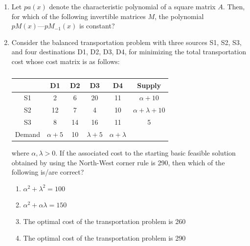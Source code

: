 \documentclass[journal,12pt,onecolumn]{IEEEtran}
\theoremstyle{remark}
\begin{document}
\begin{enumerate}
\item Let $pa(x)$ denote the characteristic polynomial of a square matrix $A$. Then, for which of the following invertible matrices $M$, the polynomial $pM(x) — pM_{-1}(x)$ is constant?  

\begin{enumerate}
\end{enumerate}  
\hfill{}

\item Consider the balanced transportation problem with three sources S1, S2, S3, and four destinations D1, D2, D3, D4, for minimizing the total transportation cost whose cost matrix is as follows:  

\begin{table}[h!]
\centering
\begin{tabular}{|c|c|c|c|c|c|}
\hline
        & D1 & D2 & D3 & D4 & Supply \\ \hline
S1      & 2  & 6  & 20 & 11 & $\alpha+10$ \\ \hline
S2      & 12 & 7  & 4  & 10 & $\alpha+\lambda+10$ \\ \hline
S3      & 8  & 14 & 16 & 11 & 5 \\ \hline
Demand  & $\alpha+5$ & 10 & $\lambda+5$ & $\alpha+\lambda$ & \\ \hline
\end{tabular}
\caption*{}
\label{tab:q24}
\end{table}  

where $\alpha, \lambda > 0$. If the associated cost to the starting basic feasible solution obtained by using the North-West corner rule is 290, then which of the following is/are correct?  

\begin{enumerate}
\item $\alpha^2 + \lambda^2 = 100$
\item $\alpha^2 + \alpha\lambda = 150$
\item The optimal cost of the transportation problem is 260
\item The optimal cost of the transportation problem is 290
\end{enumerate}  
\hfill{}


\end{enumerate}
\end{document}
